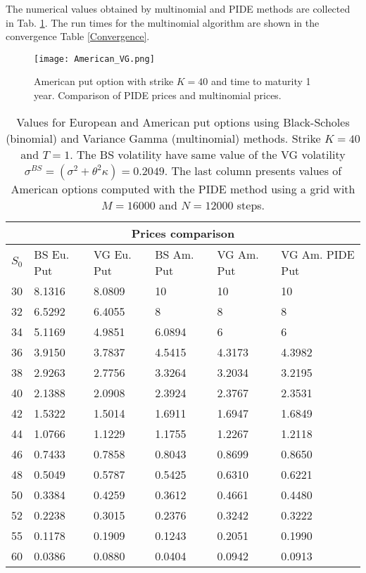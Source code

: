 The numerical values obtained by multinomial and PIDE methods are collected in Tab. \ref{Option_values3}.
The run times for the multinomial algorithm are shown in the convergence Table \ref{Convergence}.
\begin{figure}[ht!]
 \centering
 \texttt{[image: American\_VG.png]}
 \caption{American put option with strike $K=40$ and time to maturity 1 year. Comparison of PIDE prices and multinomial prices.}
 \label{AmVG}
\end{figure}
\begin{table}[ht]
{\begin{tabular}{llllll}
\toprule
 \multicolumn{6}{c}{Prices comparison} \\
\midrule
$S_0$ & BS Eu. Put & VG Eu. Put & BS Am. Put & VG Am. Put & VG Am. PIDE Put \\
 \midrule
  30 & 8.1316 & 8.0809 & 10     & 10     & 10 \\
  32 & 6.5292 & 6.4055 & 8      & 8      & 8 \\
  34 & 5.1169 & 4.9851 & 6.0894 & 6      & 6 \\
  36 & 3.9150 & 3.7837 & 4.5415 & 4.3173 & 4.3982 \\
  38 & 2.9263 & 2.7756 & 3.3264 & 3.2034 & 3.2195 \\
  40 & 2.1388 & 2.0908 & 2.3924 & 2.3767 & 2.3531 \\
  42 & 1.5322 & 1.5014 & 1.6911 & 1.6947 & 1.6849 \\
  44 & 1.0766 & 1.1229 & 1.1755 & 1.2267 & 1.2118 \\
  46 & 0.7433 & 0.7858 & 0.8043 & 0.8699 & 0.8650 \\
  48 & 0.5049 & 0.5787 & 0.5425 & 0.6310 & 0.6221 \\
  50 & 0.3384 & 0.4259 & 0.3612 & 0.4661 & 0.4480 \\ 
  52 & 0.2238 & 0.3015 & 0.2376 & 0.3242 & 0.3222 \\
  55 & 0.1178 & 0.1909 & 0.1243 & 0.2051 & 0.1990 \\
  60 & 0.0386 & 0.0880 & 0.0404 & 0.0942 & 0.0913 \\ 
 \bottomrule
 \end{tabular}}
  \caption{Values for European and American put options using Black-Scholes (binomial) and Variance Gamma (multinomial) methods. 
  Strike $K=40$ and $T=1$. The BS volatility have same value of the VG volatility  
  $ \sigma^{BS} = (\sigma^2 + \theta^2 \kappa) = 0.2049$. 
  The last column presents values of American options computed with the PIDE method using a grid with $M=16000$ and $N=12000$ steps. }
 \label{Option_values3}
\end{table}

